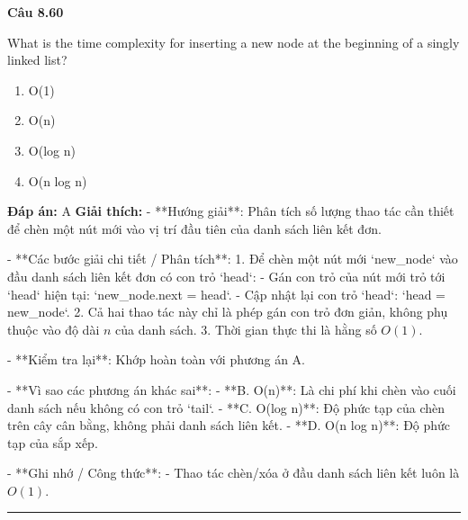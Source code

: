 \documentclass[11pt,a4paper]{article}
\newenvironment{question}[1]{%
  \par\vspace{1em}\noindent\textbf{\large Câu #1}\par\vspace{0.4em}
}{%
  \par\vspace{1em}\hrule\vspace{0.6em}
}
\newenvironment{choices}{%
  \begin{enumerate}[label=\textbf{\Alph*.},leftmargin=2.2em,itemsep=2pt,topsep=3pt]
}{%
  \end{enumerate}
}
\newcommand{\choice}{\item}
\begin{document}
\begin{question}{8.60}
What is the time complexity for inserting a new node at the beginning of a singly linked list?
\begin{choices}
\choice O(1)
\choice O(n)
\choice O(log n)
\choice O(n log n)
\end{choices}
\textbf{Đáp án:} A
\textbf{Giải thích:} - **Hướng giải**:
  Phân tích số lượng thao tác cần thiết để chèn một nút mới vào vị trí đầu tiên của danh sách liên kết đơn.

- **Các bước giải chi tiết / Phân tích**:
  1. Để chèn một nút mới `new_node` vào đầu danh sách liên kết đơn có con trỏ `head`:
     - Gán con trỏ của nút mới trỏ tới `head` hiện tại: `new_node.next = head`.
     - Cập nhật lại con trỏ `head`: `head = new_node`.
  2. Cả hai thao tác này chỉ là phép gán con trỏ đơn giản, không phụ thuộc vào độ dài \(n\) của danh sách.
  3. Thời gian thực thi là hằng số \(O(1)\).

- **Kiểm tra lại**:
  Khớp hoàn toàn với phương án A.

- **Vì sao các phương án khác sai**:
  - **B. O(n)**: Là chi phí khi chèn vào cuối danh sách nếu không có con trỏ `tail`.
  - **C. O(log n)**: Độ phức tạp của chèn trên cây cân bằng, không phải danh sách liên kết.
  - **D. O(n log n)**: Độ phức tạp của sắp xếp.

- **Ghi nhớ / Công thức**:
  - Thao tác chèn/xóa ở đầu danh sách liên kết luôn là \(O(1)\).
\end{question}
\end{document}
